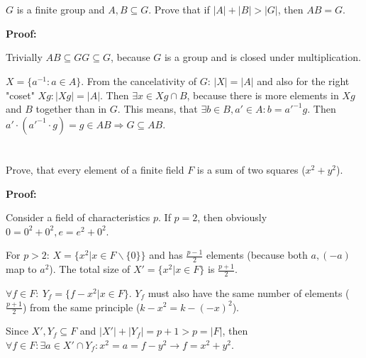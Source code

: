 \documentclass[a4paper]{article}
\begin{document}
\thispagestyle{fancy} %
{}

\section{}
$G$ is a finite group and $A, B \subseteq G$. Prove that if $|A|+|B| > |G|$, then $AB = G$.

\textbf{Proof:}

Trivially $AB \subseteq GG \subseteq G$, because $G$ is a group and is closed under multiplication.

$X = \{a^{-1}: a \in A\}$. From the cancelativity of $G$: $|X| = |A|$ and also for the right "coset" $Xg: |Xg| = |A|$. Then $\exists x \in Xg \cap B$, because there is more elements in $Xg$ and $B$ together than in $G$. This means, that $\exists b \in B, a' \in A: b = a'^{-1}g$. Then $a'\cdot (a'^{-1} \cdot g) = g \in AB \Rightarrow G \subseteq AB$.

\section{}
Prove, that every element of a finite field $F$ is a sum of two squares ($x^2 + y^2$).

\textbf{Proof:}

Consider a field of characteristics $p$. If $p=2$, then obviously $0=0^2+0^2, e = e^2+0^2$.


For $p>2$: $X=\{x^2| x\in F\backslash\{0\}\}$ and has $\frac{p-1}{2}$ elements (because both $a, (-a)$ map to $a^2$). The total size of $X' = \{x^2| x \in F\}$ is $\frac{p+1}{2}$.

$\forall f \in F:\ Y_f = \{f - x^2| x \in F \}$. $Y_f$ must also have the same number of elements ($\frac{p+1}{2}$) from the same principle ($k-x^2 = k-(-x)^2$). 

Since $X', Y_f \subseteq F$ and $|X'| + |Y_f| = p+1>p=|F|$, then $\forall f \in F: \exists a \in X' \cap Y_f: x^2 = a = f - y^2 \rightarrow f = x^2 + y^2$.
\end{document}
